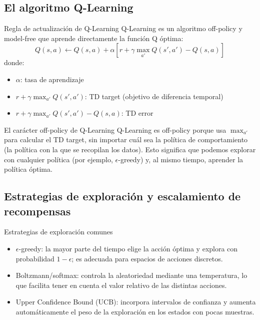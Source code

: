 \documentclass[a4paper]{article}
\begin{document}
\subsection{El algoritmo Q-Learning}

\begin{importantbox}{Regla de actualización de Q-Learning}
Q-Learning es un algoritmo off-policy y model-free que aprende directamente la función Q óptima:
$$Q(s, a) \leftarrow Q(s, a) + \alpha \left[r + \gamma \max_{a'} Q(s', a') - Q(s, a)\right]$$
donde:
\begin{itemize}
    \item $\alpha$: tasa de aprendizaje
    \item $r + \gamma \max_{a'} Q(s', a')$: TD target (objetivo de diferencia temporal)
    \item $r + \gamma \max_{a'} Q(s', a') - Q(s, a)$: TD error
\end{itemize}
\end{importantbox}

\begin{knowledgebox}{El carácter off-policy de Q-Learning}
Q-Learning es off-policy porque usa $\max_{a'}$ para calcular el TD target, sin importar cuál sea la política de comportamiento (la política con la que se recopilan los datos). Esto significa que podemos explorar con cualquier política (por ejemplo, $\epsilon$-greedy) y, al mismo tiempo, aprender la política óptima.
\end{knowledgebox}

\subsection{Estrategias de exploración y escalamiento de recompensas}

\begin{knowledgebox}{Estrategias de exploración comunes}
\begin{itemize}
    \item $\epsilon$-greedy: la mayor parte del tiempo elige la acción óptima y explora con probabilidad $1-\epsilon$; es adecuada para espacios de acciones discretos.
    \item Boltzmann/softmax: controla la aleatoriedad mediante una temperatura, lo que facilita tener en cuenta el valor relativo de las distintas acciones.
    \item Upper Confidence Bound (UCB): incorpora intervalos de confianza y aumenta automáticamente el peso de la exploración en los estados con pocas muestras.
\end{itemize}
\end{knowledgebox}
\end{document}
